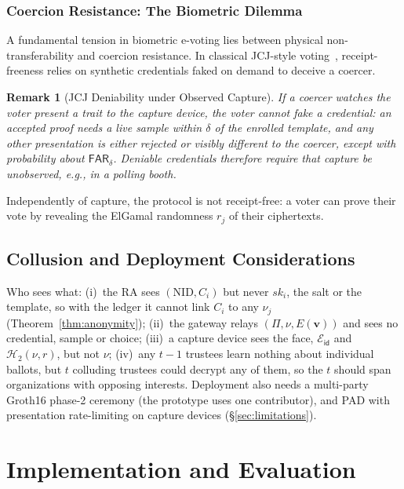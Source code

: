 \documentclass[10pt,letterpaper,journal]{IEEEtran}
\newtheorem{remark}[theorem]{Remark}
\begin{document}
\subsubsection{Coercion Resistance: The Biometric Dilemma}
\label{sec:coercion}

A fundamental tension in biometric e-voting lies between physical non-transferability and coercion resistance. In classical JCJ-style voting~\cite{Juels2005,Civitas2008}, receipt-freeness relies on synthetic credentials faked on demand to deceive a coercer.

\begin{remark}[JCJ Deniability under Observed Capture]
\label{prop:coercion-impossibility}
If a coercer watches the voter present a trait to the capture device, the voter cannot fake a credential: an accepted proof needs a live sample within $\delta$ of the enrolled template, and any other presentation is either rejected or visibly different to the coercer, except with probability about $\mathsf{FAR}_\delta$. Deniable credentials therefore require that capture be unobserved, e.g., in a polling booth.
\end{remark}
\noindent Independently of capture, the protocol is not receipt-free: a voter can prove their vote by revealing the ElGamal randomness $r_j$ of their ciphertexts.

\subsection{Collusion and Deployment Considerations}
\label{sec:collusion}\label{sec:gaps}
Who sees what: (i)~the RA sees $(\text{NID}, C_i)$ but never $sk_i$, the salt or the template, so with the ledger it cannot link $C_i$ to any $\nu_j$ (Theorem~\ref{thm:anonymity}); (ii)~the gateway relays $(\Pi, \nu, E(\mathbf{v}))$ and sees no credential, sample or choice; (iii)~a capture device sees the face, $\mathcal{E}_{\mathsf{id}}$ and $\mathcal{H}_2(\nu, r)$, but not $\nu$; (iv)~any $t-1$ trustees learn nothing about individual ballots, but $t$ colluding trustees could decrypt any of them, so the $t$ should span organizations with opposing interests. Deployment also needs a multi-party Groth16 phase-2 ceremony (the prototype uses one contributor), and PAD with presentation rate-limiting on capture devices (\S\ref{sec:limitations}).

\section{Implementation and Evaluation}
\label{sec:implementation_and_evaluation}
\end{document}

